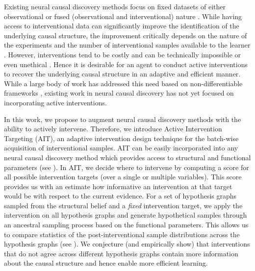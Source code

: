 \documentclass[nohyperref]{article}
\theoremstyle{plain}
\theoremstyle{definition}
\theoremstyle{remark}
\begin{document}
Existing neural causal discovery methods focus on fixed datasets of either observational \citep{zheng2018dags, yu2019dag, zheng2020learning, bengio2019meta, lorch2021dibs, annadani2021variational, cundy2021bcd} or fused (observational and interventional) nature \citep{ke2019learning, brouillard2020differentiable, lippe2021efficient}. While having access to interventional data can significantly improve the identification of the underlying causal structure, the improvement critically depends on the nature of the experiments and the number of interventional samples available to the learner \cite{heckerman1995learning, eberhardt2012number}. However, interventions tend to be costly and can be technically impossible or even unethical \cite{Peters2011b}. Hence it is desirable for an agent to conduct active interventions to recover the underlying causal structure in an adaptive and efficient manner.  While a large body of work has addressed this need based on non-differentiable frameworks \citep{he2008active, eberhardt2012almost, hyttinen2013experiment, hauser2014two, shanmugam2015learning, kocaoglu2017experimental, kocaoglu2017cost, lindgren2018experimental, ghassami2018budgeted, ghassami2019interventional, greenewald2019sample, squires2020active, murphy2001active, tong2001active, masegosa2013interactive, cho2016reconstructing, ness2017bayesian, agrawal2019abcd, zemplenyi2021bayesian, gamella2020active}, existing work in neural causal discovery has not yet focused on incorporating active interventions. 



In this work, we propose to augment neural causal discovery methods with the ability to actively intervene. Therefore, we introduce Active Intervention Targeting (AIT), an adaptive intervention design technique for the batch-wise acquisition of interventional samples. AIT can be easily incorporated into any neural causal discovery method which provides access to structural and functional parameters (see ). In AIT, we decide where to intervene by computing a score for all possible intervention targets (over a single or multiple variables). This score provides us with an estimate how informative an intervention at that target would be with respect to the current evidence. For a set of hypothesis graphs sampled from the structural belief and a \emph{fixed} intervention target, we apply the intervention on all hypothesis graphs and generate hypothetical samples through an ancestral sampling process based on the functional parameters. This allows us to compare statistics of the post-interventional sample distributions across the hypothesis graphs (see ). We conjecture (and empirically show) that interventions that do not agree across different hypothesis graphs contain more information about the causal structure and hence enable more efficient learning. 
\end{document}
